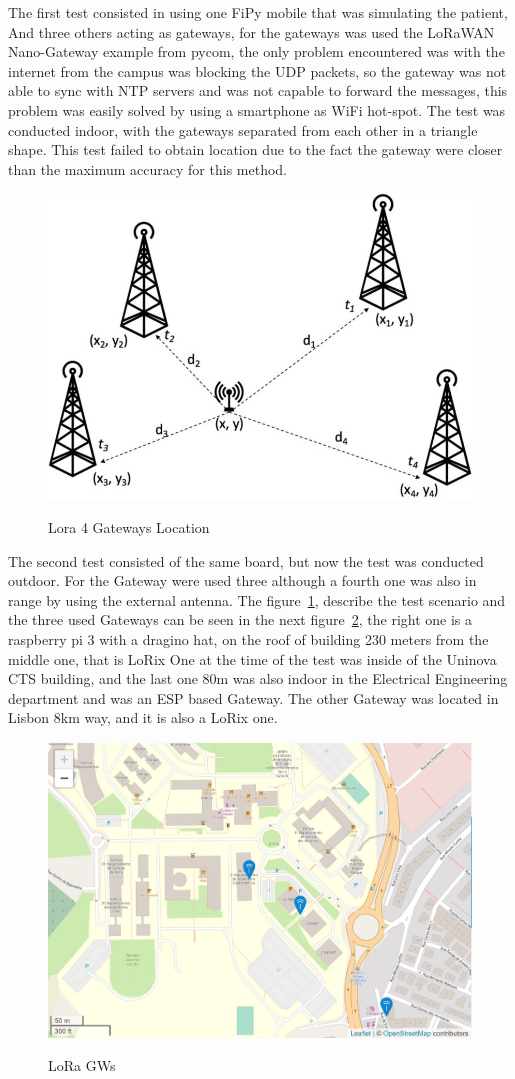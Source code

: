 The first test consisted in using one FiPy mobile that was simulating the patient, And three others acting as gateways, for the gateways was used the LoRaWAN Nano-Gateway example from pycom, the only problem encountered was with the internet from the campus was blocking the UDP packets, so the gateway was not able to sync with NTP servers and was not capable to forward the messages, this problem was easily solved by using a smartphone as WiFi hot-spot. The test was conducted indoor, with the gateways separated from each other in a triangle shape. This test failed to obtain location due to the fact the gateway were closer than the maximum accuracy for this method. 
\begin{figure}[htbp]
  \centering
  
    {\includegraphics[width=0.5\linewidth]{Chapters/Figures/123.jpg}}%
 
  \caption{Lora 4 Gateways Location}
  \label{fig:Lora_4GWs}
\end{figure}

The second test consisted of the same board, but now the test was conducted outdoor. For the Gateway were used three although a fourth one was also in range by using the external antenna. The figure~\ref{fig:Lora_4GWs}, describe the test scenario and the three used Gateways can be seen in the next figure~\ref{fig:LoRa_GWs}, the right one is a raspberry pi 3 with a dragino hat, on the roof of building 230 meters from the middle one, that is LoRix One at the time of the test was inside of the Uninova CTS building, and the last one 80m  was also indoor in the Electrical Engineering department and was an ESP based Gateway. The other Gateway was located in Lisbon 8km way, and it is also a LoRix one.

\begin{figure}[htbp]
  \centering

    {\includegraphics[width=0.6\linewidth]{Chapters/Figures/ttn3gws.JPG}}%
  \caption{LoRa GWs }
  \label{fig:LoRa_GWs}
\end{figure}

